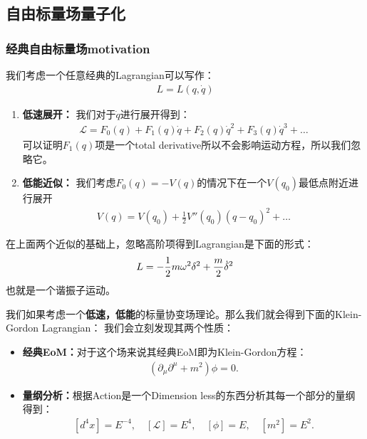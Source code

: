 \subsection{自由标量场量子化}

\subsubsection{经典自由标量场motivation}

\bigskip
{}

我们考虑一个任意经典的Lagrangian可以写作：
\begin{align}
  L = L(q,\dot{q})
\end{align}
\begin{enumerate}
  \item \textbf{低速展开：}
    我们对于$ \dot{q} $进行展开得到：
    \begin{align}
      \mathcal{L}=F_0(q)+F_1(q)\dot{q}+F_2(q)\dot{q}^2+F_3(q)\dot{q}^3+\ldots
    \end{align}
    可以证明$ F_1(q) $项是一个total derivative所以不会影响运动方程，所以我们忽略它。

  \item \textbf{低能近似：}
    我们考虑$ F_0(q) = -V(q) $的情况下在一个$ V(q_0) $最低点附近进行展开
    \begin{align}
      V(q) = V(q_0) + \frac{1}{2}V''(q_0)(q-q_0)^2 + \ldots
    \end{align}
\end{enumerate}
在上面两个近似的基础上，忽略高阶项得到Lagrangian是下面的形式：
\begin{align}
  \large L=-\frac{1}{2}m\omega^2\delta^2+\frac{m}{2}\dot{\delta}^2
\end{align}
也就是一个谐振子运动。

\bigskip
{}

我们如果考虑一个\textbf{低速，低能}的标量协变场理论。那么我们就会得到下面的Klein-Gordon Lagrangian：
我们会立刻发现其两个性质：
\begin{itemize}
  \item \textbf{经典EoM：}对于这个场来说其经典EoM即为Klein-Gordon方程：
    \begin{align}
      (\partial_\mu\partial^\mu + m^2)\phi = 0.
    \end{align}
  \item \textbf{量纲分析：}根据Action是一个Dimension
    less的东西分析其每一个部分的量纲得到：
    \begin{align}
      \left[d^4x\right]=E^{-4},\quad[\mathcal{L}]=E^4,\quad[\phi]=E,\quad\left[m^2\right]=E^2.
    \end{align}
\end{itemize}

